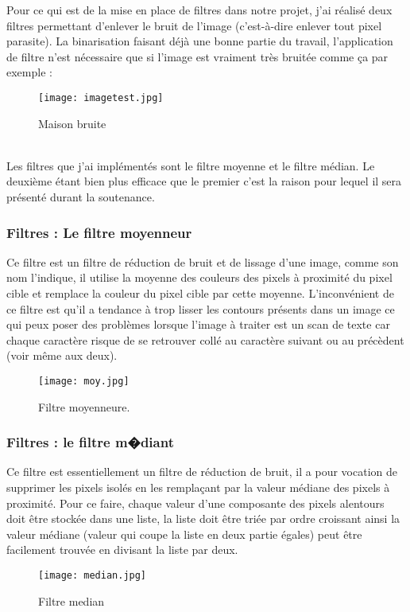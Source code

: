 \documentclass{article}
\begin{document}
Pour ce qui est de la mise en place de filtres dans notre projet, j’ai réalisé deux filtres permettant d’enlever le bruit de l’image (c’est-à-dire enlever tout pixel parasite). La
binarisation faisant déjà une bonne partie du travail, l’application de filtre n’est nécessaire que si l’image est vraiment très bruitée comme ça par exemple :\\
\newpage
    \begin{figure}[hp]
	    \centering
	    \texttt{[image: imagetest.jpg]}
	    \caption{Maison bruite}
    \end{figure}
\\
Les filtres que j’ai implémentés sont le filtre moyenne et le filtre médian. Le deuxième étant bien plus efficace que le premier c’est la raison pour lequel il sera présenté durant la soutenance.

                          \subsubsection {Filtres : Le filtre moyenneur}
Ce filtre est un filtre de réduction de bruit et de lissage d’une image, comme son nom l’indique, il utilise la moyenne des couleurs des pixels à proximité du pixel cible et remplace la couleur du pixel cible par cette moyenne. L’inconvénient de ce filtre est qu’il a tendance à trop lisser les contours présents dans un image ce qui peux poser des problèmes lorsque l’image à traiter est un scan de texte car chaque caractère risque de se retrouver collé au caractère suivant ou au précèdent (voir même aux deux).\\
\newpage
    \begin{figure}[hp]
	    \centering
	    \texttt{[image: moy.jpg]}
	    \caption{Filtre moyenneure.}
    \end{figure}
                          \subsubsection {Filtres : le filtre m�diant}
Ce filtre est essentiellement un filtre de réduction de bruit, il a pour vocation de supprimer les pixels isolés en les remplaçant par la valeur médiane des pixels à proximité. Pour ce faire, chaque valeur d’une composante des pixels alentours doit être stockée dans une liste, la liste doit être triée par ordre croissant ainsi la valeur médiane (valeur qui coupe la liste en deux partie égales) peut être facilement trouvée en divisant la liste par deux.\\
    \begin{figure}[hp]
	    \centering
	    \texttt{[image: median.jpg]}
	    \caption{Filtre median}
    \end{figure}
\\
\end{document}
